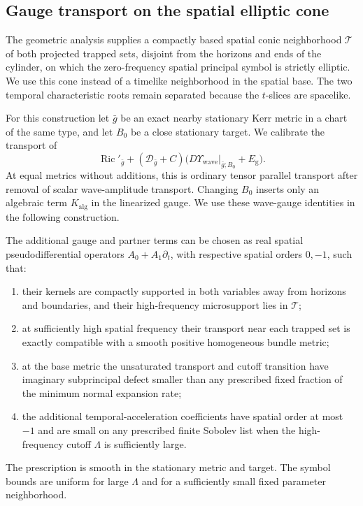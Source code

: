 \subsection{Gauge transport on the spatial elliptic cone}

The geometric analysis supplies a compactly based spatial conic
neighborhood $\mathcal T$ of both projected trapped sets, disjoint
from the horizons and ends of the cylinder, on which the
zero-frequency spatial principal symbol is strictly elliptic.
We use this cone instead of a timelike neighborhood in the spatial
base.  The two temporal characteristic roots remain separated because
the $t$-slices are spacelike.

For this construction let $\bar g$ be an exact nearby stationary Kerr
metric in a chart of the same type, and let $B_0$ be a close stationary
target.  We calibrate the transport of
\begin{equation}\label{st:frozen-general}
 \operatorname{Ric}'_{\bar g}
 +(\mathcal D_{\bar g}+C)
       \bigl(D\Upsilon_{\mathrm{wave}}|_{\bar g;B_0}
                         +E_{\mathrm g}\bigr).
\end{equation}
At equal metrics without additions, this is ordinary tensor parallel
transport after removal of scalar wave-amplitude transport.
Changing $B_0$ inserts only an algebraic term $K_{\mathrm{alg}}$
in the linearized gauge. We use these wave-gauge identities in the
following construction.

\begin{lemma}\label{st:conic-gauge}
The additional gauge and partner terms can be chosen as real spatial
pseudodifferential operators $A_0+A_1\partial_t$, with respective
spatial orders $0,-1$, such that:
\begin{enumerate}
\item their kernels are compactly supported in both variables away
from horizons and boundaries, and their high-frequency microsupport
lies in $\mathcal T$;
\item at sufficiently high spatial frequency their transport near
each trapped set is exactly compatible with a smooth positive
homogeneous bundle metric;
\item at the base metric the unsaturated transport and cutoff
transition have imaginary subprincipal defect smaller than any
prescribed fixed fraction of the minimum normal expansion rate;
\item the additional temporal-acceleration coefficients have spatial
order at most $-1$ and are small on any prescribed finite Sobolev
list when the high-frequency cutoff $\Lambda$ is sufficiently large.
\end{enumerate}
The prescription is smooth in the stationary metric and target.
The symbol bounds are uniform for large $\Lambda$ and for a
sufficiently small fixed parameter neighborhood.
\end{lemma}

